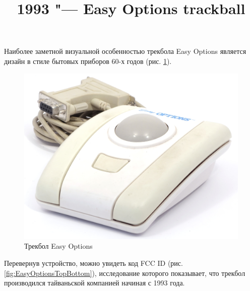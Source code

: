 \documentclass[11pt, a4paper]{article}
\begin{document}
\title{1993 "--- Easy Options trackball}
\date{}
\maketitle

Наиболее заметной визуальной особенностью трекбола Easy Options является дизайн в стиле бытовых приборов 60-х годов (рис. \ref{fig:EasyOptionsPic}).

\begin{figure}[h]
    \centering
    \includegraphics[scale=0.7]{1993_easy_options_trackball/pic_60.jpg}
    \caption{Трекбол Easy Options}
    \label{fig:EasyOptionsPic}
\end{figure}

Перевернув устройство, можно увидеть код FCC ID (рис. \ref{fig:EasyOptionsTopBottom}), исследование которого показывает, что трекбол производился тайваньской компанией начиная с 1993 года.
\end{document}
